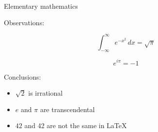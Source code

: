 \documentclass[pdf,azure,slideColor,colorBG]{prosper}
\begin{document}
\begin{slide}{Elementary mathematics}

Observations:

\[
	\int_{-\infty}^\infty e^{-x^2} \, dx = \sqrt{\pi}
\]

\[
	e^{i\pi} = -1
\]

Conclusions:

\begin{itemize}
	\item $\sqrt{2}$ is irrational
	\item $e$ and $\pi$ are transcendental
	\item $42$ and 42 are not the same in \LaTeX
\end{itemize}

\end{slide}
\end{document}
